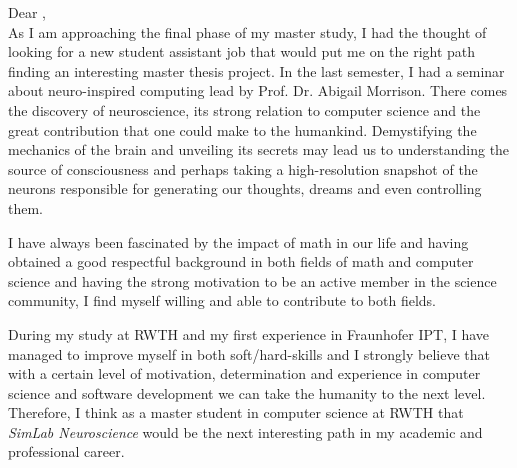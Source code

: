 Dear \contact, \\[1em]
%

As I am approaching the final phase of my master study, I had the thought of looking for a new student assistant job that would put me on the right path finding an interesting master thesis project.  In the last semester, I had a seminar about neuro-inspired computing lead by Prof. Dr. Abigail Morrison. There comes the discovery of neuroscience, its strong relation to computer science and the great contribution that one could make to the humankind. Demystifying the mechanics of the brain and unveiling its secrets may lead us to understanding the source of consciousness and perhaps taking a high-resolution snapshot of the neurons responsible for generating our thoughts, dreams and even controlling them.



I have always been fascinated by the impact of math in our life and having obtained a good respectful background in both fields of math and computer science and having the strong motivation to be an active member in the science community, I find myself willing and able to contribute to both fields.

During my study at RWTH and my first experience in Fraunhofer IPT, I have managed to improve myself in both soft/hard-skills and I strongly believe that with a certain level of motivation, determination and experience in computer science and software development we can take the humanity to the next level. Therefore, I think as a master student in computer science at RWTH that \emph{ SimLab Neuroscience} would be the next interesting path in my academic and professional career.

